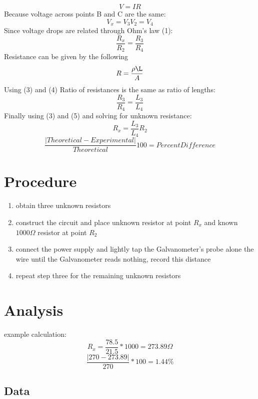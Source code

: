 \documentclass[12pt letterpaper]{article}
\begin{document}
\begin{equation}
V=IR
\end{equation}
Because voltage across points B and C are the same:
\begin{equation}
V_x = V_3
V_2 = V_4
\end{equation}
Since voltage drops are related through Ohm's law (1):
\begin{equation}
\frac{R_x}{R_2} = \frac{R_3}{R_4}
\end{equation}
Resistance can be given by the following
\begin{equation}
R = \frac{\rho\L}{A}
\end{equation}
Using (3) and (4) Ratio of resistances is the same as ratio of lengths:
\begin{equation}
\frac{R_3}{R_4} = \frac{L_3}{L_4}
\end{equation}
Finally using (3) and (5) and solving for unknown resistance:
\begin{equation}
R_x = \frac{L_3}{L_4}R_2
\end{equation}
\begin{equation}
\frac{|Theoretical - Experimental|}{Theoretical}100 = Percent Difference
\end{equation}

\section*{Procedure}
\begin{enumerate}
\item obtain three unknown resistors
\item construct the circuit and place unknown resistor at point \(R_x\) and known \(1000\Omega\) resistor at point \(R_2\)
\item connect the power supply and lightly tap the Galvanometer's probe alone the wire until the Galvanometer reads nothing, record this distance
\item repeat step three for the remaining unknown resistors
\end{enumerate}
\section*{Analysis}
example calculation:
\[R_x = \frac{78.5}{21.5}*1000 = 273.89\Omega\]
\[\frac{|270 - 273.89|}{270}*100 = 1.44\%\]
\subsection*{Data}
\begin{table}[H]
\end{table}
\end{document}
